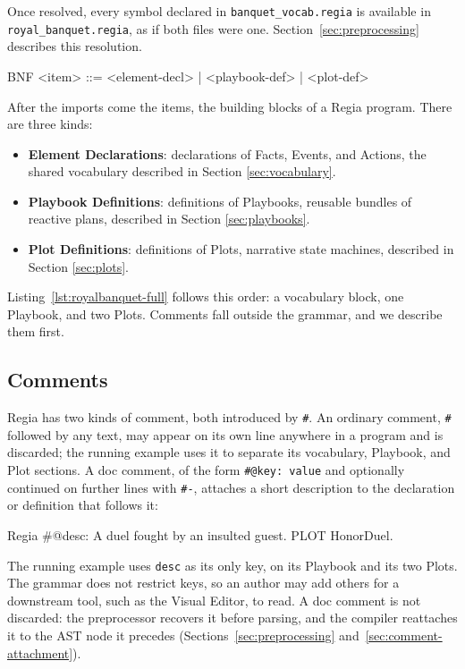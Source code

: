 Once resolved, every symbol declared in \lstinline|banquet_vocab.regia| is available in \lstinline|royal_banquet.regia|, as if both files were one. Section~\ref{sec:preprocessing} describes this resolution.
 
\begin{codeblock}[]{BNF}
    <item>           ::= <element-decl>
                       | <playbook-def>
                       | <plot-def>
\end{codeblock}
 
After the imports come the items, the building blocks of a Regia program. There are three kinds:
 
\begin{itemize}
    \item \textbf{Element Declarations}: declarations of Facts, Events, and Actions, the shared vocabulary described in Section \ref{sec:vocabulary}.
    \item \textbf{Playbook Definitions}: definitions of Playbooks, reusable bundles of reactive plans, described in Section \ref{sec:playbooks}.
    \item \textbf{Plot Definitions}: definitions of Plots, narrative state machines, described in Section \ref{sec:plots}.
\end{itemize}
 
Listing~\ref{lst:royalbanquet-full} follows this order: a vocabulary block, one Playbook, and two Plots. Comments fall outside the grammar, and we describe them first.
 
\subsection{Comments}
\label{sec:comments}
 
Regia has two kinds of comment, both introduced by \lstinline|#|. An ordinary comment, \lstinline|#| followed by any text, may appear on its own line anywhere in a program and is discarded; the running example uses it to separate its vocabulary, Playbook, and Plot sections. A doc comment, of the form \lstinline|#@key: value| and optionally continued on further lines with \lstinline|#-|, attaches a short description to the declaration or definition that follows it:
 
\begin{codeblock}[]{Regia}
#@desc: A duel fought by an insulted guest.
PLOT HonorDuel.
\end{codeblock}
 
The running example uses \lstinline|desc| as its only key, on its Playbook and its two Plots. The grammar does not restrict keys, so an author may add others for a downstream tool, such as the Visual Editor, to read. A doc comment is not discarded: the preprocessor recovers it before parsing, and the compiler reattaches it to the AST node it precedes (Sections~\ref{sec:preprocessing} and~\ref{sec:comment-attachment}).
 
